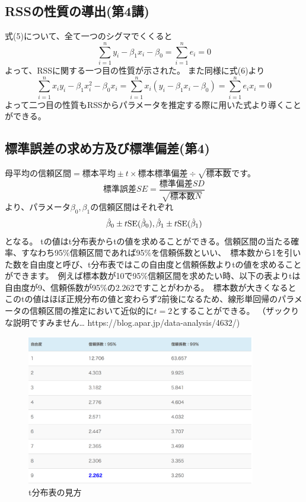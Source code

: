 \documentclass[uplatex]{jsarticle}
\begin{document}
\subsection{{\rm RSS}の性質の導出(第4講)}
式(5)について、全て一つのシグマでくくると
\begin{equation}
  \sum_{i=1}^n y_i - \beta_1x_i - \beta_0 = \sum_{i=1}^n e_i = 0
\end{equation}
よって、{\rm RSS}に関する一つ目の性質が示された。
また同様に式(6)より
\begin{equation}
  \sum_{i=1}^n x_iy_i - \beta_1x_i^2 - \beta_0 x_i = \sum_{i=1}^n x_i (y_i - \beta_1x_i - \beta_0)  =  \sum_{i=1}^n e_ix_i = 0
\end{equation}
よって二つ目の性質も{\rm RSS}からパラメータを推定する際に用いた式より導くことができる。

\subsection{標準誤差の求め方及び標準偏差(第4)}
母平均の信頼区間$ = 標本平均 \pm t \times 標本標準偏差 \div \sqrt{標本数}$です。
$$標準誤差 SE = \frac{標準偏差 SD}{\sqrt{標本数 N}}$$より、パラメータ$\beta_0, \beta_1$の信頼区間はそれぞれ
$$\hat{\beta}_0 \pm t{\rm SE}(\hat{\beta}_0), \hat{\beta}_1 \pm t{\rm SE}(\hat{\beta}_1)$$となる。
tの値はt分布表からtの値を求めることができる。信頼区間の当たる確率、すなわち95$\%$信頼区間であれば95$\%$を信頼係数といい、\
標本数から1を引いた数を自由度と呼び、t分布表ではこの自由度と信頼係数よりtの値を求めることができます。\
例えば標本数が10で95$\%$信頼区間を求めたい時、以下の表よりtは自由度が9、信頼係数が95$\%$の2.262ですことがわかる。\
標本数が大きくなるとこのtの値はほぼ正規分布の値と変わらず2前後になるため、線形単回帰のパラメータの信頼区間の推定において近似的に$t=2$とすることができる。
（ザックりな説明ですみません… https://blog.apar.jp/data-analysis/4632/)
\begin{figure}
  \begin{center}
  \includegraphics[width=10cm]{img/t_bunpu.png}
  \caption{t分布表の見方}
\end{center}
\end{figure}
\end{document}
